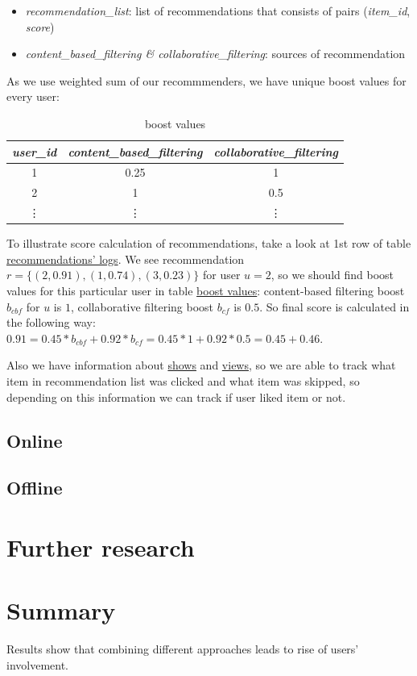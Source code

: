 \documentclass{article}
\begin{document}
    \begin{itemize}
        \item \textit{recommendation\_list}: list of recommendations that consists of pairs (\textit{item\_id}, \textit{score})
        \item \textit{content\_based\_filtering \& collaborative\_filtering}: sources of recommendation
    \end{itemize}

    As we use weighted sum of our recommmenders, we have unique boost values for every user:

    \begin{table}[]
        \centering
        \begin{tabular}{ccc}
            \toprule
            \textit{user\_id} & \textit{content\_based\_filtering} & \textit{collaborative\_filtering} \\
            \midrule
            1                 & 0.25                                  & 1                               \\
            2                 & 1                               & 0.5                                \\
            \vdots & \vdots & \vdots \\
            \bottomrule
            \end{tabular}%
        \caption{boost values}
        \label{tab:boost_values}
    \end{table}

    To illustrate score calculation of recommendations, take a look at 1st row of table \hyperref[tab:recommendation_logs]{recommendations' logs}. We see recommendation $r = \{(2, 0.91), (1, 0.74), (3, 0.23)\}$ for user $u = 2$, so we should find boost values for this particular user in table \hyperref[tab:boost_values]{boost values}: content-based filtering boost $b_{cbf}$ for $u$ is $1$, collaborative filtering boost $b_{cf}$ is $0.5$. So final score is calculated in the following way: $0.91 = 0.45 * b_{cbf} + 0.92 * b_{cf} = 0.45 * 1 + 0.92 * 0.5 = 0.45 + 0.46$.

    Also we have information about \hyperref[tab:show]{shows} and \hyperref[tab:view]{views}, so we are able to track what item in recommendation list was clicked and what item was skipped, so depending on this information we can track if user liked item or not.



\subsection{Online}

\subsection{Offline}

\section{Further research}
\label{sec:further}

\section{Summary}
\label{sec:summary}

    Results show that combining different approaches leads to rise of users' involvement.

    


  
\end{document}
